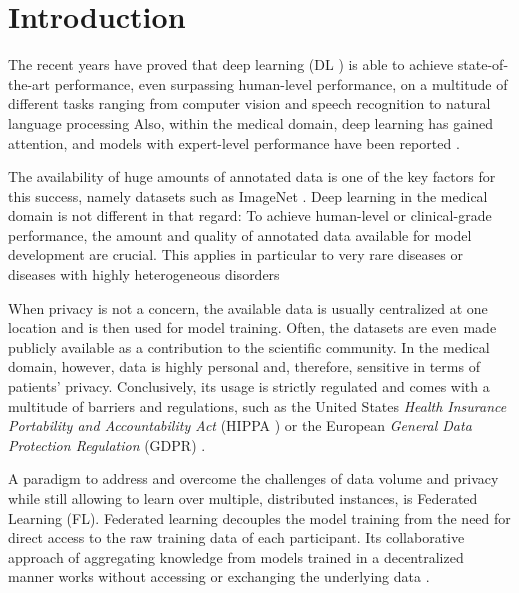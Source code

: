 \section{Introduction}
\label{sec:Introduction}



The recent years have proved that deep learning (DL \cite{Lecun2015DeepLearning}) is able to achieve state-of-the-art performance, even surpassing human-level performance, on a multitude of different tasks ranging from computer vision and speech recognition to natural language processing %
Also, within the medical domain, deep learning has gained attention, and models with expert-level performance have been reported \citep{Esteva2017Dermatologist-levelNetworks}.

The availability of huge amounts of annotated data is one of the key factors for this success, namely datasets such as ImageNet \citep{Deng2009ImageNet:Database}. Deep learning in the medical domain is not different in that regard: To achieve human-level or clinical-grade performance, the amount and quality of annotated data available for model development are crucial. This applies in particular to very rare diseases or diseases with highly heterogeneous disorders %

When privacy is not a concern, the available data is usually centralized at one location and is then used for model training. Often, the datasets are even made publicly available as a contribution to the scientific community. In the medical domain, however, data is highly personal and, therefore, sensitive in terms of patients' privacy. Conclusively, its usage is strictly regulated and comes with a multitude of barriers and regulations, such as the United States \textit{Health Insurance Portability and Accountability Act} (HIPPA \cite{USDepartmentofHealthandHumanServices2020HealthHIPPA}) or the European \textit{General Data Protection Regulation} (GDPR\cite{IntersoftConsulting2016GeneralGDPR}) \citep{vanPanhuis2014AHealth}.

A paradigm to address and overcome the challenges of data volume and privacy while still allowing to learn over multiple, distributed instances, is Federated Learning (FL). Federated learning decouples the model training from the need for direct access to the raw training data of each participant. Its collaborative approach of aggregating knowledge from models trained in a decentralized manner works without accessing or exchanging the underlying data \citep{BrendanMcMahan2017}.

